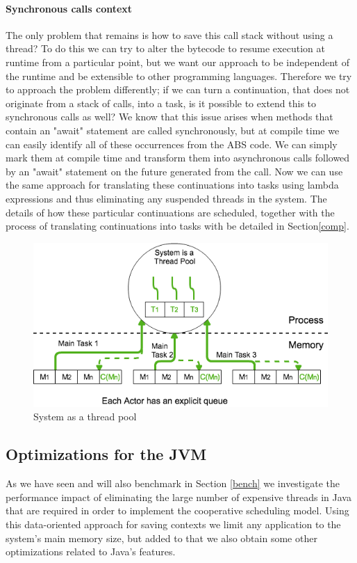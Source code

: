 \paragraph{Synchronous calls context}

The only problem that remains is how to save this call stack without using a thread? To do this we can try to alter the bytecode to resume execution at runtime from a particular point, but we want our approach to be independent of the runtime and be extensible to other programming languages. Therefore we try to approach the problem differently; if we can turn a continuation, that does not originate from a stack of calls, into a task, is it possible to extend this to synchronous calls as well? We know that this issue arises when methods that contain an "await" statement are called synchronously, but at compile time we can easily identify all of these occurrences from the ABS code. We can simply mark them at compile time and transform them into asynchronous calls followed by an "await" statement on the future generated from the call. Now we can use the same approach for translating these continuations into tasks using lambda expressions and thus eliminating any suspended threads in the system. The details of how these particular continuations are scheduled, together with the process of translating continuations into tasks with be detailed in Section\ref{comp}. 

\begin{figure}
	\label{sol}
	\centering
	\includegraphics[scale=0.5]{solution.png}
	\caption{System as a thread pool}
\end{figure}

\subsection{Optimizations for the JVM}
\label{optimizations}
As we have seen and will also benchmark in Section \ref{bench} we investigate the performance impact of eliminating the large number of expensive threads in Java that are required in order to implement the cooperative scheduling model. Using this data-oriented approach for saving contexts we limit any application to the system's main memory size, but added to that we also obtain some other optimizations related to Java's features.

